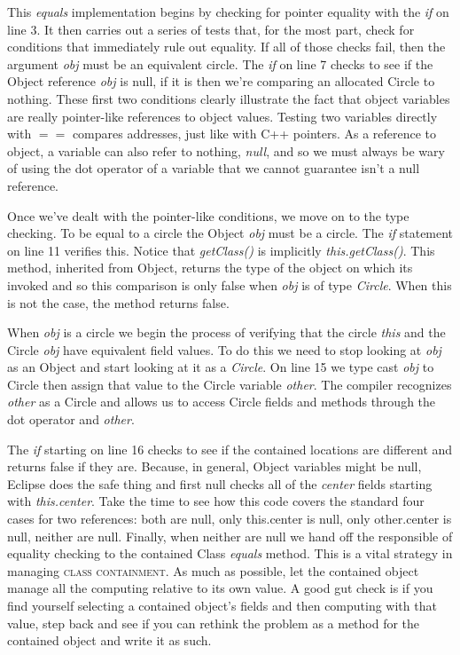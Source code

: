 \documentclass[nobib]{tufte-handout}
\begin{document}
This \textit{equals} implementation begins by checking for pointer equality with the \textit{if} on line 3. It then carries out a series of tests that, for the most part, check for conditions that immediately rule out equality. If all of those checks fail, then the argument \textit{obj} must be an equivalent circle. The \textit{if} on line 7 checks to see if the Object reference \textit{obj} is null, if it is then we're comparing an allocated Circle to nothing. These first two conditions clearly illustrate the fact that object variables are really pointer-like references to object values. Testing two variables directly with $==$ compares addresses, just like with C++ pointers. As a reference to object, a variable can also refer to nothing, \textit{null}, and so we must always be wary of using the dot operator of a variable that we cannot guarantee isn't a null reference.

Once we've dealt with the pointer-like conditions, we move on to the type checking. To be equal to a circle the Object \textit{obj} must be a circle. The \textit{if} statement on line 11 verifies this. Notice that \textit{getClass()} is implicitly \textit{this.getClass()}. This method, inherited from Object, returns the type of the object on which its invoked and so this comparison is only false when \textit{obj} is of type \textit{Circle}. When this is not the case, the method returns false.

When \textit{obj} is a circle we begin the process of verifying that the circle \textit{this} and the Circle \textit{obj} have equivalent field values. To do this we need to stop looking at \textit{obj} as an Object and start looking at it as a \textit{Circle}. On line 15 we type cast \textit{obj} to Circle then assign that value to the Circle variable \textit{other}. The compiler recognizes \textit{other} as a Circle and allows us to access Circle fields and methods through the dot operator and \textit{other}.

The \textit{if} starting on line 16 checks to see if the contained locations are different and returns false if they are. Because, in general, Object variables might be null, Eclipse does the safe thing and first null checks all of the \textit{center} fields starting with \textit{this.center}. Take the time to see how this code covers the standard four cases for two references: both are null, only this.center is null, only other.center is null, neither are null. Finally, when neither are null we hand off the responsible of equality checking to the contained Class \textit{equals} method. This is a vital strategy in managing \textsc{class containment}. As much as possible, let the contained object manage all the computing relative to its own value. A good gut check is if you find yourself selecting a contained object's fields and then computing with that value, step back and see if you can rethink the problem as a method for the contained object and write it as such.
\end{document}
